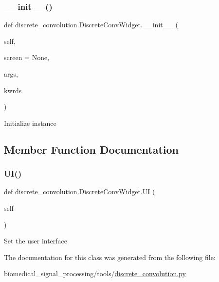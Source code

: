 \subsubsection{\texorpdfstring{\+\_\+\+\_\+init\+\_\+\+\_\+()}{\_\_init\_\_()}}
{\footnotesize\ttfamily def discrete\+\_\+convolution.\+Discrete\+Conv\+Widget.\+\_\+\+\_\+init\+\_\+\+\_\+ (\begin{DoxyParamCaption}\item[{}]{self,  }\item[{}]{screen = {\ttfamily None},  }\item[{}]{args,  }\item[{}]{kwrds }\end{DoxyParamCaption})}

\begin{DoxyVerb}Initialize instance
\end{DoxyVerb}
 

\subsection{Member Function Documentation}
\mbox{\label{classdiscrete__convolution_1_1DiscreteConvWidget_a2b2aeac10f3ca7f36cc2114844d23f27}} 
\subsubsection{\texorpdfstring{U\+I()}{UI()}}
{\footnotesize\ttfamily def discrete\+\_\+convolution.\+Discrete\+Conv\+Widget.\+UI (\begin{DoxyParamCaption}\item[{}]{self }\end{DoxyParamCaption})}

\begin{DoxyVerb}Set the user interface
\end{DoxyVerb}
 

The documentation for this class was generated from the following file\+:\begin{DoxyCompactItemize}
\item 
biomedical\+\_\+signal\+\_\+processing/tools/\hyperlink{discrete__convolution_8py}{discrete\+\_\+convolution.\+py}\end{DoxyCompactItemize}
